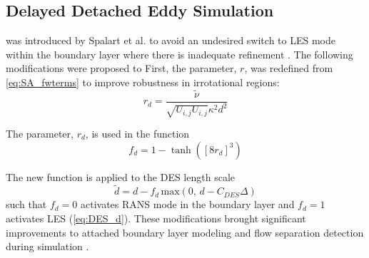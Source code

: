 \subsection{Delayed Detached Eddy Simulation} 

 was introduced by Spalart et al. to avoid an undesired switch to LES mode within the boundary layer where there is inadequate refinement \cite{Spalart2006}. The following modifications were proposed to  First, the parameter, $r$, was redefined from \cref{eq:SA_fwterms} to improve robustness in irrotational regions:
%
\begin{equation}\label{eq:rd}
    r_d = \frac{\tilde{\nu}}{\sqrt{U_{i,j}U_{i,j}}\kappa^2d^2}
\end{equation}

The parameter, $r_d$, is used in the function
%
\begin{equation}\label{eq:fd}
    f_d = 1 - \tanh([8r_d]^3)
\end{equation}

The new function is applied to the DES length scale
%
\begin{equation}\label{eq:d_tilde}
    \tilde{d} = d - f_d\, \textrm{max}(0,\, d - C_{DES}\Delta)
\end{equation}
%
such that $f_d = 0$ activates RANS mode in the boundary layer and $f_d = 1$ activates LES (\cref{eq:DES_d}). These modifications brought significant improvements to attached boundary layer modeling and flow separation detection during simulation \cite{Spalart2006}.









